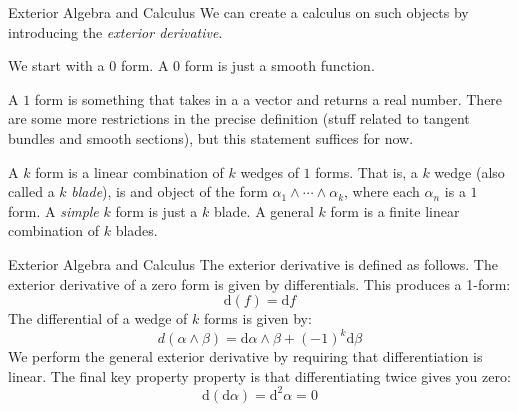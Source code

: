 \documentclass{beamer}
\begin{document}
    \begin{frame}{Exterior Algebra and Calculus}
        We can create a calculus on such objects by introducing the
        \textit{exterior derivative}.
        \par\hfill\par
        We start with a $0$ form. A $0$ form is just a smooth function.
        \par\hfill\par
        A $1$ form is something that takes in a
        a vector and returns a real number. There are some more restrictions in
        the precise definition (stuff related to tangent bundles and smooth
        sections), but this statement suffices for now.
        \par\hfill\par
        A $k$ form is a linear combination of $k$ wedges of $1$ forms. That is,
        a $k$ wedge (also called a $k$ \textit{blade}), is and object of the
        form $\alpha_{1}\land\cdots\land\alpha_{k}$, where each $\alpha_{n}$
        is a $1$ form. A \textit{simple} $k$ form is just a $k$ blade.
        A general $k$ form is a finite linear combination of $k$ blades.
    \end{frame}
    \begin{frame}{Exterior Algebra and Calculus}
        The exterior derivative is defined as follows.
        The exterior derivative of
        a zero form is given by differentials. This produces a 1-form:
        \[
            \textrm{d}(f)=\textrm{d}f
        \]
        The differential of a wedge of $k$ forms is given by:
        \[
            d\left(\alpha\land\beta\right)
            =\textrm{d}\alpha\land\beta
            +(-1)^{k}\textrm{d}\beta
        \]
        We perform the general exterior derivative by requiring that
        differentiation is linear. The final key property property is
        that differentiating twice gives you zero:
        \[
            \textrm{d}\left(\textrm{d}\alpha\right)=\textrm{d}^{2}\alpha=0
        \]
    \end{frame}
\end{document}
